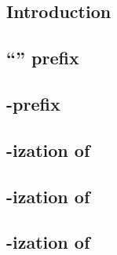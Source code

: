 \subsection{Introduction                      }  \label{rlp auth: rlp utils calls: intro}     %
\subsection{``\locMagicByte'' prefix          }  \label{rlp auth: rlp utils calls: magic}     %
\subsection{\rlp{}-prefix                     }  \label{rlp auth: rlp utils calls: prefix}    %
\subsection{\rlp{}-ization of \locChainId{}   }  \label{rlp auth: rlp utils calls: chain id}  %
\subsection{\rlp{}-ization of \locAddress{}   }  \label{rlp auth: rlp utils calls: address}   %
\subsection{\rlp{}-ization of \locNonce{}     }  \label{rlp auth: rlp utils calls: nonce}     %
